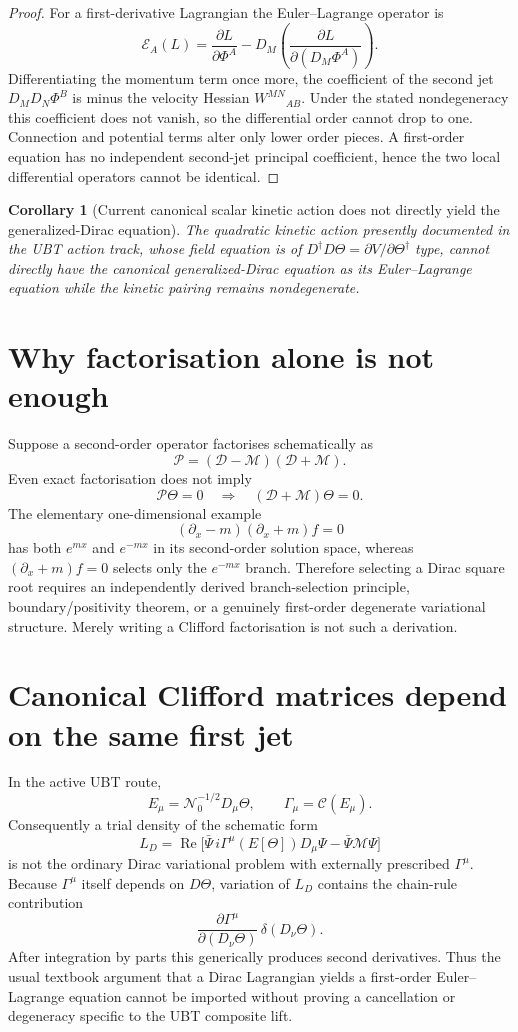 \documentclass[11pt,a4paper]{article}
\newtheorem{corollary}[theorem]{Corollary}
\begin{document}
\begin{proof}
For a first-derivative Lagrangian the Euler--Lagrange operator is
\[
\mathcal E_A(L)=\frac{\partial L}{\partial\Phi^A}
-D_M\left(\frac{\partial L}{\partial(D_M\Phi^A)}\right).
\]
Differentiating the momentum term once more, the coefficient of the second
jet $D_MD_N\Phi^B$ is minus the velocity Hessian $W^{MN}{}_{AB}$.  Under the
stated nondegeneracy this coefficient does not vanish, so the differential
order cannot drop to one.  Connection and potential terms alter only lower
order pieces.  A first-order equation has no independent second-jet principal
coefficient, hence the two local differential operators cannot be identical.
\end{proof}

\begin{corollary}[Current canonical scalar kinetic action does not directly yield the generalized-Dirac equation]
The quadratic kinetic action presently documented in the UBT action track,
whose field equation is of $D^\dagger D\Theta=\partial V/\partial\Theta^\dagger$
type, cannot directly have the canonical generalized-Dirac equation as its
Euler--Lagrange equation while the kinetic pairing remains nondegenerate.
\end{corollary}

\section{Why factorisation alone is not enough}
Suppose a second-order operator factorises schematically as
\[
\mathcal P=(\mathcal D-\mathcal M)(\mathcal D+\mathcal M).
\]
Even exact factorisation does not imply
\[
\mathcal P\Theta=0\quad\Longrightarrow\quad
(\mathcal D+\mathcal M)\Theta=0.
\]
The elementary one-dimensional example
\[
(\partial_x-m)(\partial_x+m)f=0
\]
has both $e^{mx}$ and $e^{-mx}$ in its second-order solution space, whereas
$(\partial_x+m)f=0$ selects only the $e^{-mx}$ branch.  Therefore selecting a
Dirac square root requires an independently derived branch-selection
principle, boundary/positivity theorem, or a genuinely first-order degenerate
variational structure.  Merely writing a Clifford factorisation is not such a
derivation.

\section{Canonical Clifford matrices depend on the same first jet}
In the active UBT route,
\[
E_\mu=\mathcal N_0^{-1/2}D_\mu\Theta,
\qquad
\Gamma_\mu=\mathcal C(E_\mu).
\]
Consequently a trial density of the schematic form
\[
L_D=\operatorname{Re}\bigl[\bar\Psi\,
 i\Gamma^\mu(E[\Theta])D_\mu\Psi-\bar\Psi\mathcal M\Psi\bigr]
\]
is not the ordinary Dirac variational problem with externally prescribed
$\Gamma^\mu$.  Because $\Gamma^\mu$ itself depends on $D\Theta$, variation of
$L_D$ contains the chain-rule contribution
\[
\frac{\partial\Gamma^\mu}{\partial(D_\nu\Theta)}\,\delta(D_\nu\Theta).
\]
After integration by parts this generically produces second derivatives.
Thus the usual textbook argument that a Dirac Lagrangian yields a first-order
Euler--Lagrange equation cannot be imported without proving a cancellation or
degeneracy specific to the UBT composite lift.
\end{document}
